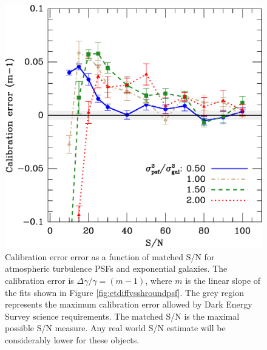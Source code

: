 \documentclass[10pt,preprint]{aastex}
\newcommand{\psf}{PSF}
\begin{document}
\begin{figure}[t] \centering
 \centering 
 \includegraphics[scale=0.65]{figures/set-s2n-et01-m-vs-shear.eps}

 \caption{Calibration error error as a function of matched S/N for atmospheric
 turbulence  \psf s and exponential galaxies.  The calibration error is
 $\Delta \gamma/\gamma = (m-1)$, where $m$ is the linear slope of the fits shown in
 Figure \ref{fig:etdiffvsshroundpsf}.  The grey region represents the 
 maximum calibration error allowed by Dark Energy Survey science
 requirements.  The matched S/N is the maximal possible S/N measure.  Any real
 world S/N estimate will be considerably lower for these objects.} 

 \label{fig:etcaliberr}

\end{figure}
\end{document}
